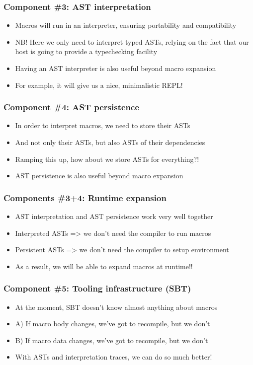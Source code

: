 \documentclass[svgnames,dvipsnames,hyperref={bookmarks=false}]{beamer}
\begin{document}
\begin{frame}[fragile]
\frametitle{Component \#3: AST interpretation}

\begin{itemize}
\item Macros will run in an interpreter, ensuring portability and compatibility
\item NB! Here we only need to interpret typed ASTs, relying on the fact that our host is going to provide a typechecking facility
\item Having an AST interpreter is also useful beyond macro expansion
\item For example, it will give us a nice, minimalistic REPL!
\end{itemize}
\end{frame}

\begin{frame}[fragile]
\frametitle{Component \#4: AST persistence}

\begin{itemize}
\item In order to interpret macros, we need to store their ASTs
\item And not only their ASTs, but also ASTs of their dependencies
\item Ramping this up, how about we store ASTs for everything?!
\item AST persistence is also useful beyond macro expansion
\end{itemize}
\end{frame}

\begin{frame}[fragile]
\frametitle{Components \#3+4: Runtime expansion}

\begin{itemize}
\item AST interpretation and AST persistence work very well together
\item Interpreted ASTs => we don't need the compiler to run macros
\item Persistent ASTs => we don't need the compiler to setup environment
\item As a result, we will be able to expand macros at runtime!!
\end{itemize}
\end{frame}

\begin{frame}[fragile]
\frametitle{Component \#5: Tooling infrastructure (SBT)}

\begin{itemize}
\item At the moment, SBT doesn't know almost anything about macros
\item A) If macro body changes, we've got to recompile, but we don't
\item B) If macro data changes, we've got to recompile, but we don't
\item With ASTs and interpretation traces, we can do so much better!
\end{itemize}
\end{frame}
\end{document}
